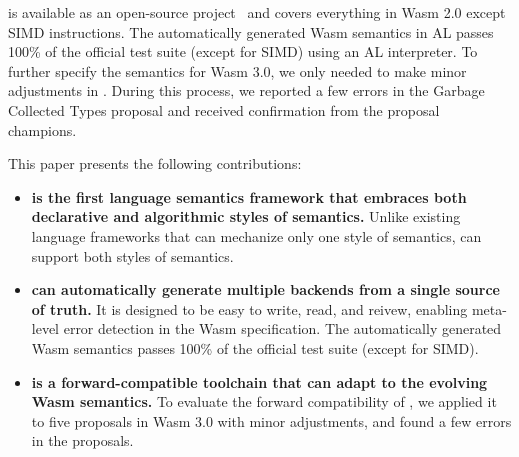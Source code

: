 \spectec is available as an open-source project~\cite{spectec}
and covers everything in Wasm 2.0 except SIMD instructions.
The automatically generated Wasm semantics in AL passes
100\% of the official test suite (except for SIMD) using an AL interpreter.
To further specify the semantics for Wasm 3.0, we only needed
to make minor adjustments in \spectec. During this process, we
reported a few errors in the Garbage Collected Types proposal and
received confirmation from the proposal champions.

This paper presents the following contributions:
\begin{itemize}
\item \textbf{\spectec is the first language semantics framework that
embraces both declarative and algorithmic styles of semantics.}
Unlike existing language frameworks that can mechanize only one style of semantics,
\spectec can support both styles of semantics.

\item \textbf{\spectec can automatically generate multiple backends from 
a single source of truth.}
It is designed to be easy to write, read, and reivew, enabling
meta-level error detection in the Wasm specification.
The automatically generated Wasm semantics passes
100\% of the official test suite (except for SIMD).


\item \textbf{\spectec is a forward-compatible toolchain that can
adapt to the evolving Wasm semantics.}
To evaluate the forward compatibility of \spectec, we applied it to five proposals
in Wasm 3.0 with minor adjustments, and found a few errors in the proposals.
\end{itemize}
